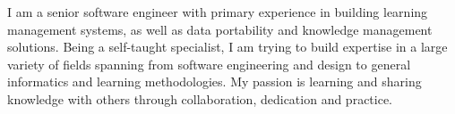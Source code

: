 \documentclass[8pt]{developercv} %
\begin{document}
\vspace{0.5cm}



\begin{minipage}[t]{0.4\textwidth} %
	\vspace{-\baselineskip} %
	{I am a senior software engineer with primary experience in building learning management systems, as well as data portability and knowledge management solutions.}
	{Being a self-taught specialist, I am trying to build expertise in a large variety of fields spanning from software engineering and design to general informatics and learning methodologies.}
	{My passion is learning and sharing knowledge with others through collaboration, dedication and practice.}
\end{minipage}
\hfill %
\begin{minipage}[t]{0.5\textwidth} %
	\vspace{-\baselineskip} %
	\begin{barchart}{5.5}
	\end{barchart}
\end{minipage}


\end{document}

